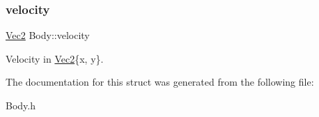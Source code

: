 \subsubsection{\texorpdfstring{velocity}{velocity}}
{\footnotesize\ttfamily \mbox{\hyperlink{struct_vec2}{Vec2}} Body\+::velocity}



Velocity in \mbox{\hyperlink{struct_vec2}{Vec2}}\{x, y\}. 



The documentation for this struct was generated from the following file\+:\begin{DoxyCompactItemize}
\item 
Body.\+h\end{DoxyCompactItemize}
